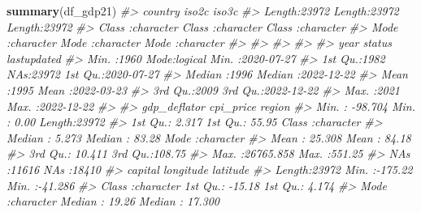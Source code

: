 \documentclass[
  xelatex, ja=standard]{bxjsbook}
\newenvironment{Shaded}{\begin{snugshade}}{\end{snugshade}}
\newcommand{\CommentTok}[1]{\textcolor[rgb]{0.56,0.35,0.01}{\textit{#1}}}
\newcommand{\FunctionTok}[1]{\textcolor[rgb]{0.13,0.29,0.53}{\textbf{#1}}}
\newcommand{\NormalTok}[1]{#1}
\theoremstyle{definition}
\theoremstyle{definition}
\theoremstyle{definition}
\theoremstyle{definition}
\theoremstyle{remark}
\begin{document}
\begin{Shaded}
\begin{Highlighting}[]
\FunctionTok{summary}\NormalTok{(df\_gdp21)}
\CommentTok{\#\textgreater{}    country             iso2c              iso3c          }
\CommentTok{\#\textgreater{}  Length:23972       Length:23972       Length:23972      }
\CommentTok{\#\textgreater{}  Class :character   Class :character   Class :character  }
\CommentTok{\#\textgreater{}  Mode  :character   Mode  :character   Mode  :character  }
\CommentTok{\#\textgreater{}                                                          }
\CommentTok{\#\textgreater{}                                                          }
\CommentTok{\#\textgreater{}                                                          }
\CommentTok{\#\textgreater{}                                                          }
\CommentTok{\#\textgreater{}       year       status         lastupdated        }
\CommentTok{\#\textgreater{}  Min.   :1960   Mode:logical   Min.   :2020{-}07{-}27  }
\CommentTok{\#\textgreater{}  1st Qu.:1982   NA\textquotesingle{}s:23972     1st Qu.:2020{-}07{-}27  }
\CommentTok{\#\textgreater{}  Median :1996                  Median :2022{-}12{-}22  }
\CommentTok{\#\textgreater{}  Mean   :1995                  Mean   :2022{-}03{-}23  }
\CommentTok{\#\textgreater{}  3rd Qu.:2009                  3rd Qu.:2022{-}12{-}22  }
\CommentTok{\#\textgreater{}  Max.   :2021                  Max.   :2022{-}12{-}22  }
\CommentTok{\#\textgreater{}                                                    }
\CommentTok{\#\textgreater{}   gdp\_deflator         cpi\_price         region         }
\CommentTok{\#\textgreater{}  Min.   :  {-}98.704   Min.   :  0.00   Length:23972      }
\CommentTok{\#\textgreater{}  1st Qu.:    2.317   1st Qu.: 55.95   Class :character  }
\CommentTok{\#\textgreater{}  Median :    5.273   Median : 83.28   Mode  :character  }
\CommentTok{\#\textgreater{}  Mean   :   25.308   Mean   : 84.18                     }
\CommentTok{\#\textgreater{}  3rd Qu.:   10.411   3rd Qu.:108.75                     }
\CommentTok{\#\textgreater{}  Max.   :26765.858   Max.   :551.25                     }
\CommentTok{\#\textgreater{}  NA\textquotesingle{}s   :11616       NA\textquotesingle{}s   :18410                      }
\CommentTok{\#\textgreater{}    capital            longitude          latitude      }
\CommentTok{\#\textgreater{}  Length:23972       Min.   :{-}175.22   Min.   :{-}41.286  }
\CommentTok{\#\textgreater{}  Class :character   1st Qu.: {-}15.18   1st Qu.:  4.174  }
\CommentTok{\#\textgreater{}  Mode  :character   Median :  19.26   Median : 17.300  }

\end{Highlighting}
\end{Shaded}
\end{document}
